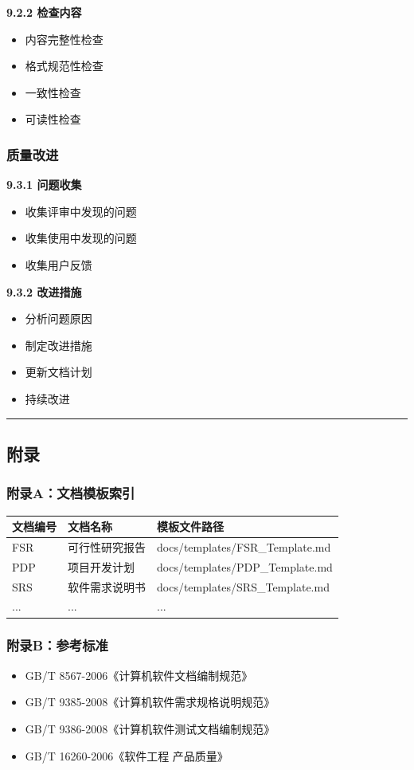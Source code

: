 \documentclass[12pt,a4paper]{article}
\numberwithin{equation}{section}  %
\begin{document}
\textbf{9.2.2 检查内容}
\begin{itemize}
\item 内容完整性检查
\item 格式规范性检查
\item 一致性检查
\item 可读性检查
\end{itemize}

\subsubsection{质量改进}
\textbf{9.3.1 问题收集}
\begin{itemize}
\item 收集评审中发现的问题
\item 收集使用中发现的问题
\item 收集用户反馈
\end{itemize}

\textbf{9.3.2 改进措施}
\begin{itemize}
\item 分析问题原因
\item 制定改进措施
\item 更新文档计划
\item 持续改进
\end{itemize}

\hrule
\subsection{附录}
\subsubsection{附录A：文档模板索引}
\begin{longtable}{|p{4cm}|p{5cm}|p{5cm}|}
\hline
文档编号 & 文档名称 & 模板文件路径 \\
\hline
FSR & 可行性研究报告 & docs/templates/FSR\_Template.md \\
PDP & 项目开发计划 & docs/templates/PDP\_Template.md \\
SRS & 软件需求说明书 & docs/templates/SRS\_Template.md \\
... & ... & ... \\
\hline
\end{longtable}

\subsubsection{附录B：参考标准}
\begin{itemize}
\item GB/T 8567-2006《计算机软件文档编制规范》
\item GB/T 9385-2008《计算机软件需求规格说明规范》
\item GB/T 9386-2008《计算机软件测试文档编制规范》
\item GB/T 16260-2006《软件工程 产品质量》
\end{itemize}
\end{document}
